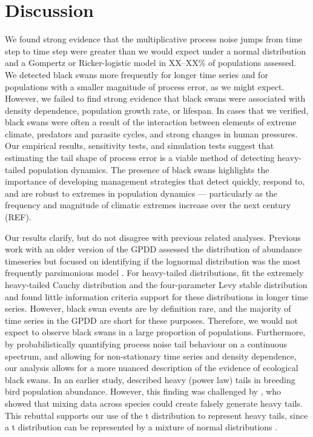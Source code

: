 \section{Discussion}

We found strong evidence that the multiplicative process noise jumps from time
step to time step were greater than we would expect under a normal distribution
and a Gompertz or Ricker-logistic model in XX--XX\% of populations assessed. We
detected black swans more frequently for longer time series and for populations
with a smaller magnitude of process error, as we might expect. However, we
failed to find strong evidence that black swans were associated with density
dependence, population growth rate, or lifespan. In cases that we verified,
black swans were often a result of the interaction between elements of extreme
climate, predators and parasite cycles, and strong changes in human pressures.
Our empirical results, sensitivity tests, and simulation tests suggest that
estimating the tail shape of process error is a viable method of detecting
heavy-tailed population dynamics. The presence of black swans highlights the
importance of developing management strategies that detect quickly, respond to,
and are robust to extremes in population dynamics --- particularly as the
frequency and magnitude of climatic extremes increase over the next century
(REF).

Our results clarify, but do not disagree with previous related analyses.
Previous work with an older version of the GPDD assessed the distribution of
abundance timeseries but focused on identifying if the lognormal distribution
was the most frequently parsimonious model \citep{halley2002}. For heavy-tailed
distributions, \citet{halley2002} fit the extremely heavy-tailed Cauchy
distribution and the four-parameter Levy stable distribution and found little
information criteria support for these distributions in longer time series.
However, black swan events are by definition rare, and the majority of time
series in the GPDD are short for these purposes. Therefore, we would not expect
to observe black swans in a large proportion of populations. Furthermore, by
probabilistically quantifying process noise tail behaviour on a continuous
spectrum, and allowing for non-stationary time series and density dependence,
our analysis allows for a more nuanced description of the evidence of
ecological black swans. In an earlier study, \citet{keitt1998} described heavy
(power law) tails in breeding bird population abundance. However, this finding
was challenged by \citet{allen2001}, who showed that mixing data across species
could create falsely generate heavy tails. This rebuttal supports our use of
the t distribution to represent heavy tails, since a t distribution can be
represented by a mixture of normal distributions \citep[with
inverse-gamma-distributed variances,][]{gelman2014}.

